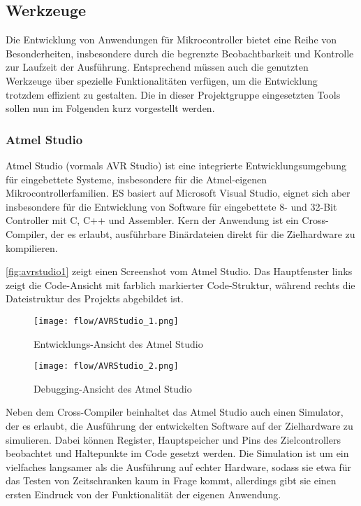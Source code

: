 \subsection{Werkzeuge}
Die Entwicklung von Anwendungen für Mikrocontroller bietet eine Reihe von Besonderheiten, insbesondere durch die begrenzte Beobachtbarkeit und Kontrolle zur Laufzeit der Ausführung. Entsprechend müssen auch die genutzten Werkzeuge über spezielle Funktionalitäten verfügen, um die Entwicklung trotzdem effizient zu gestalten. Die in dieser Projektgruppe eingesetzten Tools sollen nun im Folgenden kurz vorgestellt werden.

\subsubsection{Atmel Studio}
Atmel Studio (vormals AVR Studio) ist eine integrierte Entwicklungsumgebung für eingebettete Systeme, insbesondere für die Atmel-eigenen Mikrocontrollerfamilien.
ES basiert auf Microsoft Visual Studio, eignet sich aber insbesondere für die Entwicklung von Software für eingebettete 8- und 32-Bit Controller mit C, C++ und Assembler.
Kern der Anwendung ist ein Cross-Compiler, der es erlaubt, ausführbare Binärdateien direkt für die Zielhardware zu kompilieren.

\autoref{fig:avrstudio1} zeigt einen Screenshot vom Atmel Studio. Das Hauptfenster links zeigt die Code-Ansicht mit farblich markierter Code-Struktur, während rechts die Dateistruktur des Projekts abgebildet ist.

\begin{figure}[!t]
  \centering
    \texttt{[image: flow/AVRStudio\_1.png]}
    \caption{Entwicklungs-Ansicht des Atmel Studio}
    \label{fig:avrstudio1}
\end{figure}

\begin{figure}[!h]
  \centering
    \texttt{[image: flow/AVRStudio\_2.png]}
    \caption{Debugging-Ansicht des Atmel Studio}
    \label{fig:avrstudio2}
\end{figure}

Neben dem Cross-Compiler beinhaltet das Atmel Studio auch einen Simulator, der es erlaubt, die Ausführung der entwickelten Software auf der Zielhardware zu simulieren. Dabei können Register, Hauptspeicher und Pins des Zielcontrollers beobachtet und Haltepunkte im Code gesetzt werden. Die Simulation ist um ein vielfaches langsamer als die Ausführung auf echter Hardware, sodass sie etwa für das Testen von Zeitschranken kaum in Frage kommt, allerdings gibt sie einen ersten Eindruck von der Funktionalität der eigenen Anwendung.

